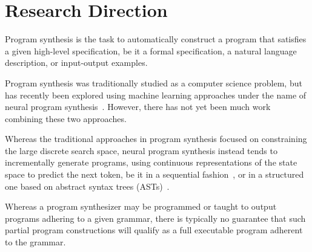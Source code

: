 \documentclass{article}
\begin{document}


\section{Research Direction}

Program synthesis is the task to automatically construct a program that satisfies a given high-level specification,
be it a formal specification, a natural language description, or input-output examples.


Program synthesis was traditionally studied as a computer science problem, but has recently been explored using machine learning approaches under the name of neural program synthesis~\citep{nps}.
However, there has not yet been much work combining these two approaches.

Whereas the traditional approaches in program synthesis focused on constraining the large discrete search space, neural program synthesis instead tends to incrementally generate programs, using continuous representations of the state space to predict the next token, be it in a sequential fashion~\citep{alphanpi}, or in a structured one based on abstract syntax trees (ASTs)~\citep{nsps}.


Whereas a program synthesizer may be programmed or taught to output programs adhering to a given grammar, there is typically no guarantee that such partial program constructions will qualify as a full executable program adherent to the grammar.

\end{document}
